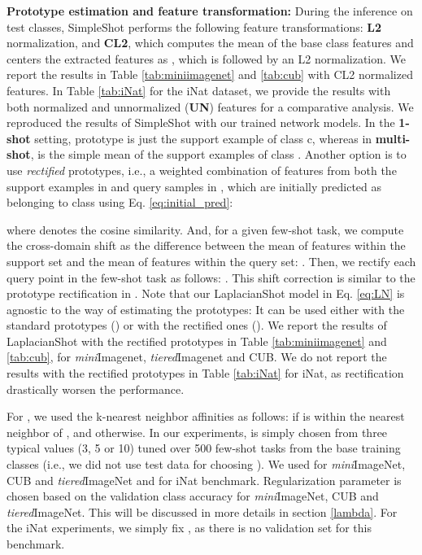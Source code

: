 \documentclass{article}
\begin{document}
\textbf{Prototype estimation and feature transformation:}
During the inference on test classes, SimpleShot \cite{wang2019simpleshot} performs the following feature transformations: \textbf{L2} normalization,  and \textbf{CL2}, which computes the mean of the base class features  and centers the extracted features as , which is followed by an L2 normalization. We report the results in Table \ref{tab:miniimagenet} and \ref{tab:cub} with CL2 normalized features. In Table \ref{tab:iNat} for the iNat dataset, we provide the results with both normalized and unnormalized (\textbf{UN}) features for a comparative analysis. We reproduced the results of SimpleShot with our trained network models. In the \textbf{1-shot} setting, prototype  is just the support example  of class c, whereas in \textbf{multi-shot},  is the simple mean of the support examples of class . Another option is to use \emph{rectified} prototypes, i.e., a weighted combination of features from both the support examples in  and query samples in , which are initially predicted as belonging to class  using Eq. \eqref{eq:initial_pred}: 

where  denotes the cosine similarity. And, for a given few-shot task, we compute the cross-domain shift  as the difference between the mean of features within the support set and the mean of features within the query set: . 
Then, we rectify each query point  in the few-shot task as follows: . This shift correction is similar to the prototype rectification in \cite{liu2019prototype}.
Note that our LaplacianShot model in Eq. \eqref{eq:LN} is agnostic to the way of estimating the prototypes: It can be used either with the standard prototypes () or with the rectified ones (). 
We report the results of LaplacianShot with the rectified prototypes in Table \ref{tab:miniimagenet} and \ref{tab:cub}, for \textit{mini}Imagenet, \textit{tiered}Imagenet and CUB. We do not report the results with the rectified prototypes in Table \ref{tab:iNat} for iNat, as rectification drastically worsen the performance.

For , we used the k-nearest neighbor affinities as follows:  if  is within the  nearest neighbor of , and  otherwise. In our experiments,  is simply chosen from three typical values (3, 5 or 10) tuned over 500 few-shot tasks from the base training classes (i.e., we did not use test data for choosing ). We used  for \textit{mini}ImageNet, CUB and \textit{tiered}ImageNet and  for iNat benchmark. Regularization parameter  is chosen based on the validation class accuracy for \textit{mini}ImageNet, CUB and \textit{tiered}ImageNet. This will be discussed in more details in section \ref{lambda}. For the iNat experiments, we simply fix , as there is no validation set for this benchmark.
\end{document}

